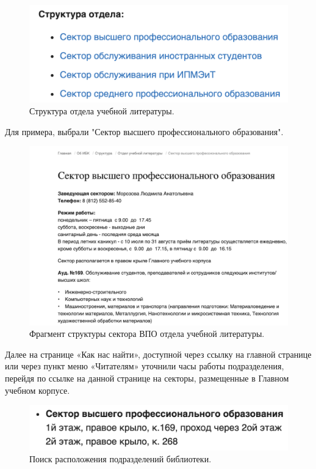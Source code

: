 \documentclass[14pt,a4paper,report]{report}
\begin{document}
\begin{figure}[h!]
\centering
\includegraphics[scale = 0.5]{121.png}
\caption{Структура отдела учебной литературы.}
\label{image:1}
\end{figure}

\clearpage

Для примера, выбрали "Сектор высшего профессионального образования".

\begin{figure}[h!]
\centering
\includegraphics[scale = 0.5]{122.png}
\caption{Фрагмент структуры сектора ВПО отдела учебной литературы.}
\label{image:1}
\end{figure}

Далее на странице «Как нас найти», доступной через ссылку на главной странице или через пункт меню «Читателям» уточнили часы работы подразделения, перейдя по ссылке на данной странице на секторы, размещенные в Главном учебном корпусе.

\begin{figure}[h!]
\centering
\includegraphics[scale = 0.5]{123.png}
\caption{Поиск расположения подразделений библиотеки.}
\label{image:1}
\end{figure}
\end{document}
